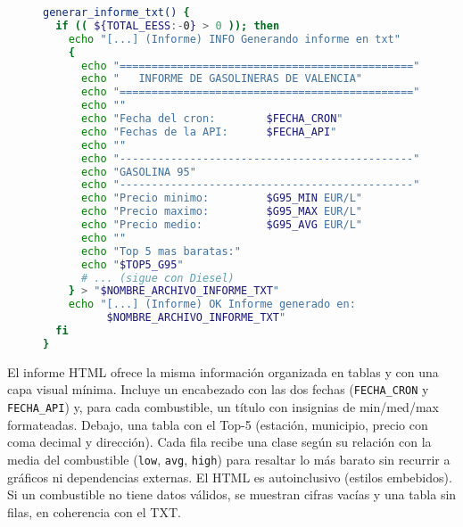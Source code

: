 \begin{figure}[H]
  \begin{lstlisting}[language=bash, caption={Figura 5.4 — Generación del informe TXT (extracto)}]
generar_informe_txt() {
  if (( ${TOTAL_EESS:-0} > 0 )); then
    echo "[...] (Informe) INFO Generando informe en txt"
    {
      echo "=============================================="
      echo "   INFORME DE GASOLINERAS DE VALENCIA"
      echo "=============================================="
      echo ""
      echo "Fecha del cron:        $FECHA_CRON"
      echo "Fechas de la API:      $FECHA_API"
      echo ""
      echo "----------------------------------------------"
      echo "GASOLINA 95"
      echo "----------------------------------------------"
      echo "Precio minimo:         $G95_MIN EUR/L"
      echo "Precio maximo:         $G95_MAX EUR/L"
      echo "Precio medio:          $G95_AVG EUR/L"
      echo ""
      echo "Top 5 mas baratas:"
      echo "$TOP5_G95"
      # ... (sigue con Diesel)
    } > "$NOMBRE_ARCHIVO_INFORME_TXT"
    echo "[...] (Informe) OK Informe generado en: 
          $NOMBRE_ARCHIVO_INFORME_TXT"
  fi
}
\end{lstlisting}
\end{figure}

El informe HTML ofrece la misma información organizada en tablas y con una capa visual mínima. Incluye un encabezado con las dos fechas (\texttt{FECHA\_CRON} y \texttt{FECHA\_API}) y, para cada combustible, un título con insignias de min/med/max formateadas. Debajo, una tabla con el Top-5 (estación, municipio, precio con coma decimal y dirección). Cada fila recibe una clase según su relación con la media del combustible (\texttt{low}, \texttt{avg}, \texttt{high}) para resaltar lo más barato sin recurrir a gráficos ni dependencias externas. El HTML es autoinclusivo (estilos embebidos). Si un combustible no tiene datos válidos, se muestran cifras vacías y una tabla sin filas, en coherencia con el TXT.

